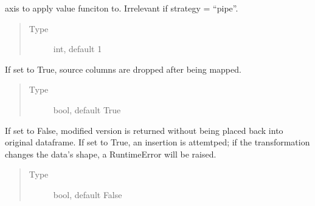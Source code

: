 \documentclass[letterpaper,10pt,english]{sphinxmanual}
\begin{document}
\begin{fulllineitems}
\begin{fulllineitems}
\begin{quote}
\begin{description}
\end{description}\end{quote}

\end{fulllineitems}


\begin{fulllineitems}
\label{\detokenize{beginners-guide:dalio.pipe.col_generation._ColGeneration.axis}}
axis to apply value funciton to. Irrelevant if
strategy = “pipe”.
\begin{quote}\begin{description}
\item[{Type}] \leavevmode
int, default 1

\end{description}\end{quote}

\end{fulllineitems}


\begin{fulllineitems}
\label{\detokenize{beginners-guide:dalio.pipe.col_generation._ColGeneration.drop}}
If set to True, source columns are dropped
after being mapped.
\begin{quote}\begin{description}
\item[{Type}] \leavevmode
bool, default True

\end{description}\end{quote}

\end{fulllineitems}


\begin{fulllineitems}
\label{\detokenize{beginners-guide:dalio.pipe.col_generation._ColGeneration.reintegrate}}
If set to False, modified version is
returned without being placed back into original dataframe. If set
to True, an insertion is attemtped; if the transformation changes
the data’s shape, a RuntimeError will be raised.
\begin{quote}\begin{description}
\item[{Type}] \leavevmode
bool, default False


\end{description}
\end{quote}
\end{fulllineitems}
\end{fulllineitems}
\end{document}
